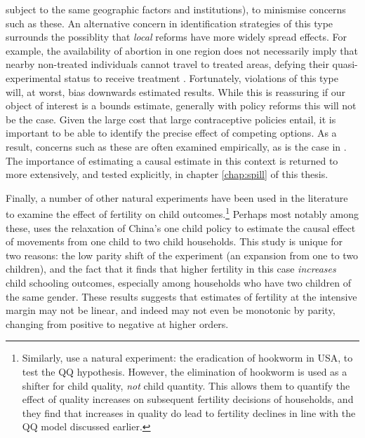 subject to the same geographic factors and institutions), to minismise concerns 
such as these. An alternative concern in identification strategies of this type 
surrounds the possiblity that \emph{local} reforms have more widely spread
effects.  For example, the availability of abortion in one region does not
necessarily imply that nearby non-treated individuals cannot travel to
treated areas, defying their quasi-experimental status to receive treatment 
\citep{Levineetal1999}. Fortunately, violations of this type will, at worst, 
bias downwards estimated results. While this is reassuring if our object of
interest is a bounds estimate, generally with policy reforms this will not be
the case.  Given the large cost that large contraceptive policies entail, it
is important to be able to identify the precise effect of competing options. 
As a result, concerns such as these are often examined empirically, as is the 
case in \citet{Christensen2012}. The importance of estimating a causal estimate
in this context is returned to more extensively, and tested explicitly, in 
chapter \ref{chap:spill} of this thesis.

Finally, a number of other natural experiments have been used in the 
literature to examine the effect of fertility on child outcomes.\footnote{
Similarly, \citet{BleakleyLange2009} use a natural experiment: the eradication
of hookworm in USA, to test the QQ hypothesis.  However, the elimination of
hookworm is used as a shifter for child quality, \emph{not} child quantity.
This allows them to quantify the effect of quality increases on subsequent
fertility decisions of households, and they find that increases in quality
do lead to fertility declines in line with the QQ model discussed earlier.}
Perhaps most notably among these, \citet{Qian2009} uses the relaxation of 
China's one child policy to estimate the causal effect of movements from one 
child to two child households.  This study is unique for two reasons: the low 
parity shift of the experiment (an expansion from one to two children), and the 
fact that it finds that higher fertility in this case \emph{increases} child 
schooling outcomes, especially among households who have two children of the 
same gender. These results suggests that estimates of fertility at the intensive 
margin may not be linear, and indeed may not even be monotonic by parity, 
changing from positive to negative at higher orders.

